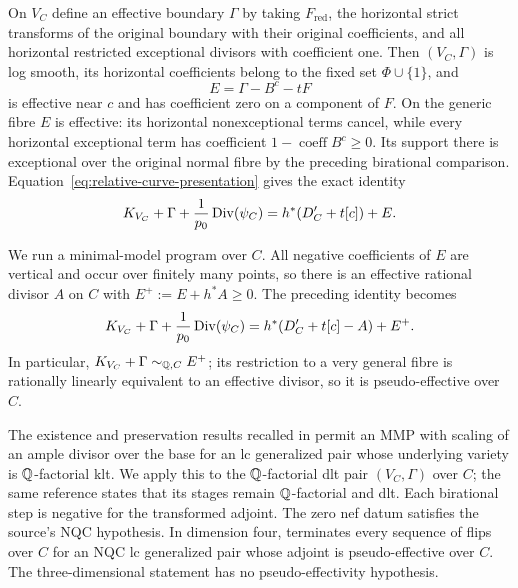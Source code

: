 On $V_C$ define an effective boundary $\Gamma$ by taking $F_{\mathrm{red}}$,
the horizontal strict transforms of the original boundary with their
original coefficients, and all horizontal restricted exceptional divisors
with coefficient one.  Then $(V_C,\Gamma)$ is log smooth, its horizontal
coefficients belong to the fixed set $\Phi\cup\{1\}$, and
\begin{equation}\label{eq:relative-error}
 E=\Gamma-B^c-tF
\end{equation}
is effective near $c$ and has coefficient zero on a component of $F$.
On the generic fibre $E$ is effective: its horizontal nonexceptional
terms cancel, while every horizontal exceptional term has coefficient
$1-\operatorname{coeff}B^c\geq0$.  Its support there is exceptional over
the original normal fibre by the preceding birational comparison.
Equation~\eqref{eq:relative-curve-presentation} gives the exact identity
\[
 K_{V_C}+\Gamma+\frac1{p_0}\operatorname{Div}(\psi_C)
     =h^*(D'_C+t[c])+E.
\]

We run a minimal-model program over $C$.  All negative coefficients of
$E$ are vertical and occur over finitely many points, so there is an
effective rational divisor $A$ on $C$ with $E^+:=E+h^*A\geq0$.  The
preceding identity becomes
\[
 K_{V_C}+\Gamma+\frac1{p_0}\operatorname{Div}(\psi_C)
     =h^*(D'_C+t[c]-A)+E^+.
\]
In particular, $K_{V_C}+\Gamma\sim_{\mathbb Q,C}E^+$; its restriction to a very
general fibre is rationally linearly equivalent to an effective divisor,
so it is pseudo-effective over $C$.

The existence and preservation results recalled in
\cite[Remark~2.11, arXiv version~2]{ChenTsakanikas2023} permit an MMP with
scaling of an ample divisor over the base for an lc generalized pair whose
underlying variety is $\mathbb Q$-factorial klt.  We apply this to the
$\mathbb Q$-factorial dlt pair $(V_C,\Gamma)$ over $C$; the same reference states
that its stages remain $\mathbb Q$-factorial and dlt.  Each birational step is
negative for the transformed adjoint.  The zero nef datum satisfies the
source's NQC hypothesis.  In dimension four,
\cite[Theorem~1.1, arXiv version~2]{ChenTsakanikas2023} terminates every
sequence of flips over $C$ for an NQC lc generalized pair whose adjoint is
pseudo-effective over $C$.  The three-dimensional statement
\cite[Theorem~1.2, arXiv version~2]{ChenTsakanikas2023} has no
pseudo-effectivity hypothesis.

